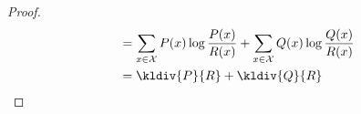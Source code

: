 \documentclass[
  coursecode={MTHE 474},
  assignmentname={Homework \homeworknumber},
  studentnumber=20053722,
  name={Bryan Hoang},
  11pt,
]{
  ltxanswer%
}
\begin{document}
\begin{questions}
\begin{solution}
\begin{proof}
\begin{align*}
           &= \sum_{x\in\mathcal{X}} P(x) \log \frac{P(x)}{R(x)} + \sum_{x\in\mathcal{X}} Q(x) \log \frac{Q(x)}{R(x)}                                                                                                                                                                      \\
           &= \kldiv{P}{R} + \kldiv{Q}{R}
        \end{align*}
      \end{proof}
    \end{solution}
  \end{questions}
\end{document}
